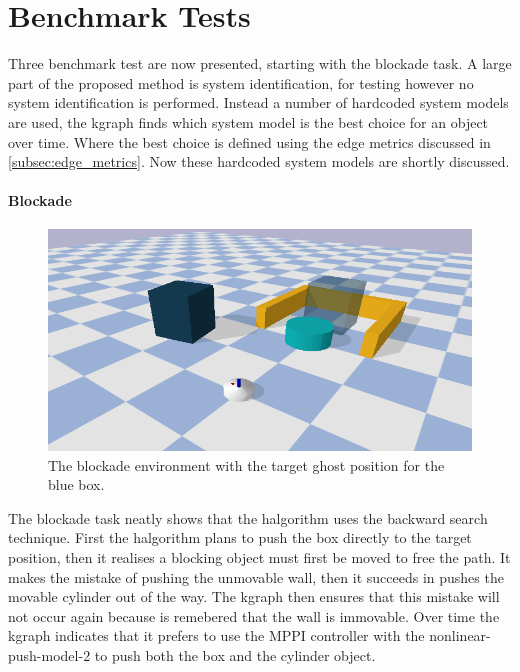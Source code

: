 \newpage
\section{Benchmark Tests}%
\label{sec:benchmark_tests}
Three benchmark test are now presented, starting with the blockade task. A large part of the proposed method is system identification, for testing however no system identification is performed. Instead a number of hardcoded system models are used, the \ac{kgraph} finds which system model is the best choice for an object over time. Where the best choice is defined using the edge metrics discussed in \cref{subsec:edge_metrics}. Now these hardcoded system models are shortly discussed.\bs


\paragraph{Blockade}
\begin{figure}[H]
    \centering
    \includegraphics[width=13cm]{figures/tests/blockade}
    \caption{The blockade environment with the target ghost position for the blue box.}%
    \label{fig:benchmark_blockade}
\end{figure}

The blockade task neatly shows that the \ac{halgorithm} uses the backward search technique. First the \ac{halgorithm} plans to push the box directly to the target position, then it realises a blocking object must first be moved to free the path. It makes the mistake of pushing the unmovable wall, then it succeeds in pushes the movable cylinder out of the way. The \ac{kgraph} then ensures that this mistake will not occur again because is remebered that the wall is immovable. Over time the \ac{kgraph} indicates that it prefers to use the \ac{MPPI} controller with the nonlinear-push-model-2 to push both the box and the cylinder object.\bs
{}


